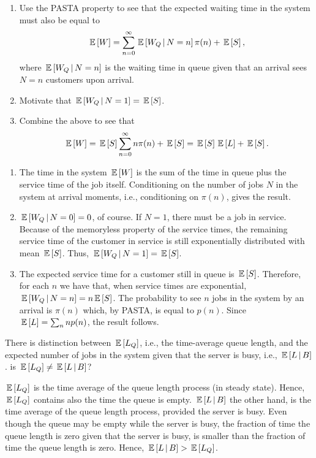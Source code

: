 \begin{question}
  \begin{enumerate}
  \item 
  Use the PASTA property to see that the expected waiting time in the
  system must also be equal to
\begin{equation*}
  \,\mathbb{E}\left[W\right] = \sum_{n=0}^\infty \,\mathbb{E}\left[W_Q \,\middle|\, N=n\right] \pi(n) + \,\mathbb{E}\left[S\right],
\end{equation*}
where $\,\mathbb{E}\left[W_Q \,\middle|\, N=n\right]$ is the waiting time in queue given that an
arrival sees $N=n$ customers upon arrival. 
\item Motivate that $\,\mathbb{E}\left[W_Q \,\middle|\, N=1\right] = \,\mathbb{E}\left[S\right]$. 
\item  Combine the above to see that 
\begin{equation*}
  \,\mathbb{E}\left[W\right] = \,\mathbb{E}\left[S\right] \sum_{n=0}^\infty n \pi(n) + \,\mathbb{E}\left[S\right] = \,\mathbb{E}\left[S\right] \,\mathbb{E}\left[L\right] + \,\mathbb{E}\left[S\right].
\end{equation*}
  \end{enumerate}
  \begin{solution}
    \begin{enumerate}
    \item The time in the system $\,\mathbb{E}\left[W\right]$ is the sum of the time in
      queue plus the service time of the job itself.  Conditioning on
      the number of jobs $N$ in the system at arrival moments, i.e.,
      conditioning on $\pi(n)$, gives the result.  
    \item $\,\mathbb{E}\left[W_Q\,\middle|\, N=0\right]=0$, of course. If $N=1$, there must be a job
      in service.  Because of the memoryless property of the service
      times, the remaining service time of the customer in service is
      still exponentially distributed with mean $\,\mathbb{E}\left[S\right]$. Thus,
      $\,\mathbb{E}\left[W_Q\,\middle|\, N=1\right]=\,\mathbb{E}\left[S\right]$. 
    \item The expected service time for a customer still in queue is
      $\,\mathbb{E}\left[S\right]$.  Therefore, for each $n$ we have that, when service
      times are exponential, $\,\mathbb{E}\left[W_Q\,\middle|\, N=n\right]= n \,\mathbb{E}\left[S\right]$. The probability
      to see $n$ jobs in the system by an arrival is $\pi(n)$ which,
      by PASTA, is equal to $p(n)$. Since $\,\mathbb{E}\left[L\right] = \sum_n n p(n)$, the
      result follows.
    \end{enumerate}
  \end{solution}
\end{question}

\begin{question}
  There is distinction between $\,\mathbb{E}\left[L_Q\right]$, i.e., the time-average queue
  length, and the expected number of jobs in the system given that the
  server is busy, i.e., $\,\mathbb{E}\left[L\,\middle|\, B\right]$.  is $\,\mathbb{E}\left[L_Q\right] \neq \,\mathbb{E}\left[L\,\middle|\, B\right]$?
\begin{solution}
  $\,\mathbb{E}\left[L_Q\right]$ is the time average of the queue length process (in steady
  state). Hence, $\,\mathbb{E}\left[L_Q\right]$ contains also the time the queue is
  empty. $\,\mathbb{E}\left[L\,\middle|\, B\right]$ the other hand, is the time average of the
  queue length process, provided the server is busy. Even though the
  queue may be empty while the server is busy, the fraction of time
  the queue length is zero given that the server is busy, is smaller
  than the fraction of time the queue length is zero.  Hence,
  $\,\mathbb{E}\left[L\,\middle|\, B\right] > \,\mathbb{E}\left[L_Q\right]$.
\end{solution}
\end{question}

